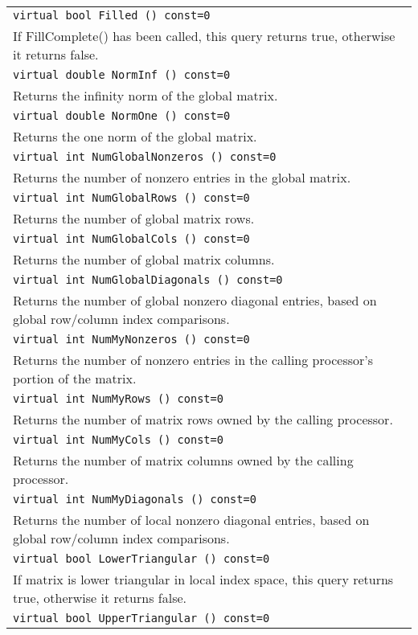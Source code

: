 \begin{table}
\begin{center}
\begin{tabular}{ | p{15cm} | }
\hline
\tt virtual bool 
Filled () const=0 \\
If FillComplete() has been called, this query returns true, otherwise it
returns false. \\
\tt virtual double 
NormInf () const=0 \\
Returns the infinity norm of the global matrix. \\
\tt virtual double 
NormOne () const=0 \\
Returns the one norm of the global matrix. \\
\tt virtual int 
NumGlobalNonzeros () const=0 \\
Returns the number of nonzero entries in the global matrix. \\
\tt virtual int 
NumGlobalRows () const=0 \\
Returns the number of global matrix rows. \\
\tt virtual int 
NumGlobalCols () const=0 \\
Returns the number of global matrix columns. \\
\tt virtual int 
NumGlobalDiagonals () const=0 \\
Returns the number of global nonzero diagonal entries, based on global
row/column index comparisons. \\
\tt virtual int 
NumMyNonzeros () const=0 \\
Returns the number of nonzero entries in the calling processor's portion
of the matrix. \\
\tt virtual int 
NumMyRows () const=0 \\
Returns the number of matrix rows owned by the calling processor. \\
\tt virtual int 
NumMyCols () const=0 \\
Returns the number of matrix columns owned by the calling processor. \\
\tt virtual int 
NumMyDiagonals () const=0 \\
Returns the number of local nonzero diagonal entries, based on global
row/column index comparisons. \\
\tt virtual bool 
LowerTriangular () const=0 \\
If matrix is lower triangular in local index space, this query returns
true, otherwise it returns false. \\
\tt virtual bool 
UpperTriangular () const=0 \\

\end{tabular}
\end{center}
\end{table}
